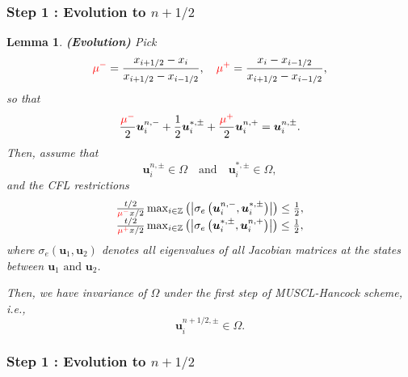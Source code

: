 \documentclass{beamer}
\newcommand{\infixand}{\text{ and }}
\newcommand{\tmcolor}[2]{{\color{#1}{#2}}}
\newcommand{\tmmathbf}[1]{\ensuremath{\boldsymbol{#1}}}
\newcommand{\tmtextbf}[1]{{\bfseries{#1}}}
\newtheorem{lemma}{Lemma}
{\theorembodyfont{\rmfamily}\newtheorem{remark}{Remark}}
\newcommand{\bw}{\tmmathbf{u}}
\begin{document}
{{\begin{frame}
  \ 
\end{frame}}{\begin{frame}
  \frametitle{Step 1 : Evolution to $n + 1 / 2$}
  
  \begin{lemma}
    \label{lemma:m.h.step.1}\tmtextbf{(Evolution)} Pick
    \[ \tmcolor{red}{\mu^-} = \frac{x_{i + 1 / 2} - x_i}{x_{i + 1 / 2} - x_{i
       - 1 / 2}}, \quad \tmcolor{red}{\mu^+} = \frac{x_i - x_{i - 1 / 2}}{x_{i
       + 1 / 2} - x_{i - 1 / 2}}, \]
    so that
    \[ \frac{\tmcolor{red}{\mu^-}}{2} \bw_i^{n, -} + \frac{1}{2} \bw_i^{\ast,
       \pm} + \frac{\tmcolor{red}{\mu^+}}{2} \bw_i^{n, +} = \bw_i^{n, \pm} .
    \]
    Then, assume that
    \[ \bw_i^{n, \pm} \in \Omega \quad \text{and} \quad \bw_i^{\ast, \pm} \in
       \Omega, \]
    and the CFL restrictions
    \begin{equation}
      \begin{array}{c}
        \frac{t / 2}{\tmcolor{red}{\mu^-} x / 2} \max_{i \in \mathbb{Z}}
        \left( \left| \sigma_e \left( \bw_i^{n, -}, \bw_i^{\ast, \pm} \right)
        \right| \right) \leq \frac{1}{2},\\
        \frac{t / 2}{\tmcolor{red}{\mu^+} x / 2} \max_{i \in \mathbb{Z}}
        \left( \left| \sigma_e \left( \bw_i^{\ast, \pm}, \bw_i^{n, +} \right)
        \right| \right) \leq \frac{1}{2},
      \end{array} \label{eq:new.cfl1}
    \end{equation}
    where $\sigma_e \left( \bw_1, \bw_2 \right)$ denotes all eigenvalues of
    all Jacobian matrices at the states between $\bw_1 \infixand \bw_2$.
    
    Then, we have invariance of $\Omega$ under the first step of MUSCL-Hancock
    scheme, i.e.,
    \[ \bw_i^{n + 1 / 2, \pm} \in \Omega . \]
  \end{lemma}
\end{frame}}{\begin{frame}
  \frametitle{Step 1 : Evolution to $n + 1 / 2$}
  

\end{frame}}}
\end{document}
